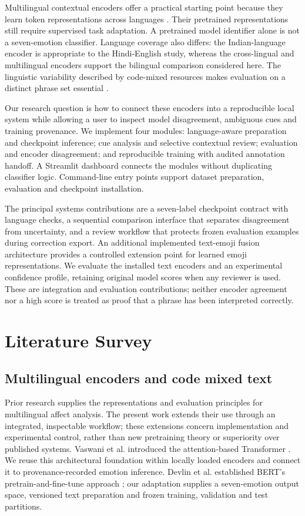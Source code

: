 \documentclass[conference]{IEEEtran}
\begin{document}
Multilingual contextual encoders offer a practical starting point because they learn token representations across languages \cite{devlin2019,conneau2020,khanuja2021}. Their pretrained representations still require supervised task adaptation. A pretrained model identifier alone is not a seven-emotion classifier. Language coverage also differs: the Indian-language encoder is appropriate to the Hindi-English study, whereas the cross-lingual and multilingual encoders support the bilingual comparison considered here. The linguistic variability described by code-mixed resources makes evaluation on a distinct phrase set essential \cite{aguilar2020,vijay2018}.

Our research question is how to connect these encoders into a reproducible local system while allowing a user to inspect model disagreement, ambiguous cues and training provenance. We implement four modules: language-aware preparation and checkpoint inference; cue analysis and selective contextual review; evaluation and encoder disagreement; and reproducible training with audited annotation handoff. A Streamlit dashboard connects the modules without duplicating classifier logic. Command-line entry points support dataset preparation, evaluation and checkpoint installation.

The principal systems contributions are a seven-label checkpoint contract with language checks, a sequential comparison interface that separates disagreement from uncertainty, and a review workflow that protects frozen evaluation examples during correction export. An additional implemented text-emoji fusion architecture provides a controlled extension point for learned emoji representations. We evaluate the installed text encoders and an experimental confidence profile, retaining original model scores when any reviewer is used. These are integration and evaluation contributions; neither encoder agreement nor a high score is treated as proof that a phrase has been interpreted correctly.

\section{Literature Survey}

\subsection{Multilingual encoders and code mixed text}

Prior research supplies the representations and evaluation principles for multilingual affect analysis. The present work extends their use through an integrated, inspectable workflow; these extensions concern implementation and experimental control, rather than new pretraining theory or superiority over published systems. Vaswani et al. introduced the attention-based Transformer \cite{vaswani2017}. We reuse this architectural foundation within locally loaded encoders and connect it to provenance-recorded emotion inference. Devlin et al. established BERT's pretrain-and-fine-tune approach \cite{devlin2019}; our adaptation supplies a seven-emotion output space, versioned text preparation and frozen training, validation and test partitions.
\end{document}
